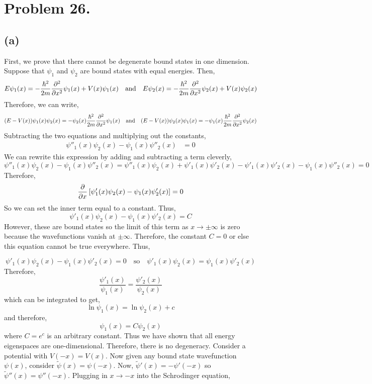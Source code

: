 \documentclass[12pt]{extarticle}
\begin{document}
 
\section*{Problem 26.}

\subsection*{(a)}
First, we prove that there cannot be degenerate bound states in one dimension. Suppose that $\psi_1$ and $\psi_2$ are bound states with equal energies. Then,
\[ E \psi_1(x) = - \frac{\hbar^2}{2m} \frac{\partial^2{}}{\partial{x}^2} \psi_1(x) + V(x) \psi_1(x) \quad \text{and} \quad E \psi_2(x) = - \frac{\hbar^2}{2m} \frac{\partial^2{}}{\partial{x}^2} \psi_2(x) + V(x) \psi_2(x) \]
Therefore, we can write,
\[ (E - V(x))\psi_1(x) \psi_2(x) = -\psi_2(x) \frac{\hbar^2}{2m} \frac{\partial^2{}}{\partial{x}^2} \psi_1(x) \quad \text{and} \quad (E - V(x))\psi_2(x) \psi_1(x) = - \psi_1(x) \frac{\hbar^2}{2m} \frac{\partial^2{}}{\partial{x}^2} \psi_2(x) \]
Subtracting the two equations and multiplying out the constants,
\begin{align*}
\psi''_1(x) \psi_2(x) - \psi_1(x) \psi''_2(x) & = 0 
\end{align*}
We can rewrite this expression by adding and subtracting a term cleverly,
\[ \psi''_1(x) \psi_2(x) - \psi_1(x) \psi''_2(x) = \psi''_1(x) \psi_2(x) + \psi'_1(x) \psi'_2(x) - \psi'_1(x) \psi'_2(x) - \psi_1(x) \psi''_2(x) = 0\]
Therefore, 
\[ \frac{\partial{}}{\partial{x}} \left[ \psi'_1(x) \psi_2(x) - \psi_1(x) \psi'_2(x) \right] = 0 \]
So we can set the inner term equal to a constant. Thus,
\[\psi'_1(x) \psi_2(x) - \psi_1(x) \psi'_2(x) = C\]
However, these are bound states so the limit of this term as $x \to \pm \infty$ is zero because the wavefunctions vanish at $\pm \infty$. Therefore, the constant $C = 0$ or else this equation cannot be true everywhere. Thus,

\[ \psi'_1(x) \psi_2(x) - \psi_1(x) \psi'_2(x) = 0 \quad \text{so} \quad \psi'_1(x) \psi_2(x) = \psi_1(x) \psi'_2(x)\]
Therefore,
\[\frac{\psi'_1(x)}{\psi_1(x)} = \frac{\psi'_2(x)}{\psi_2(x)}\]
which can be integrated to get,
\[ \ln {\psi_1(x) }  = \ln { \psi_2(x) } + c \]
and therefore,
\[ \psi_1(x) = C \psi_2(x)\]
where $C = e^c$ is an arbitrary constant. Thus we have shown that all energy eigenspaces are one-dimensional. Therefore, there is no degeneracy. Consider a potential with $V(-x) = V(x)$. Now given any bound state wavefunction $\psi(x)$, consider $\tilde{\psi}(x) = \psi(-x)$. Now, $\tilde{\psi}'(x) = - \psi'(-x)$ so $\tilde{\psi}''(x) = \psi''(-x)$. Plugging in $x \to -x$ into the Schrodinger equation,
\end{document}
